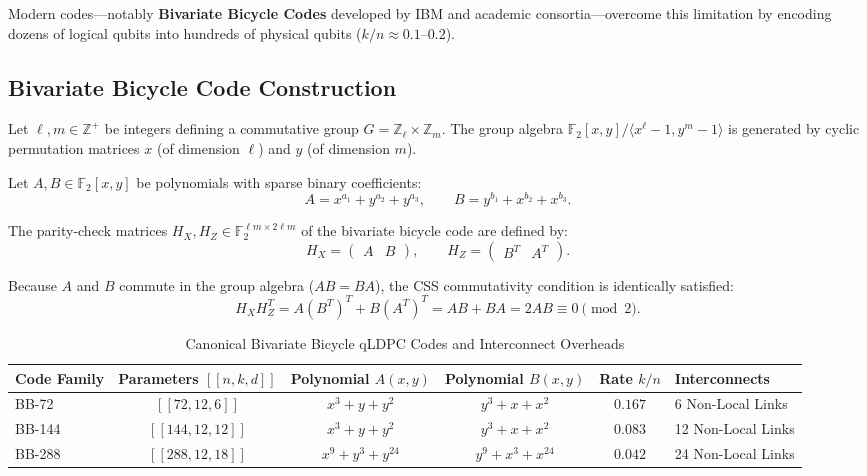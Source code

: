 Modern  codes---notably \textbf{Bivariate Bicycle Codes} developed by IBM and academic consortia---overcome this limitation by encoding dozens of logical qubits into hundreds of physical qubits ($k/n \approx 0.1\text{--}0.2$).

\subsection{Bivariate Bicycle Code Construction}
Let $\ell, m \in \mathbb{Z}^+$ be integers defining a commutative group $G = \mathbb{Z}_\ell \times \mathbb{Z}_m$. The group algebra $\mathbb{F}_2[x, y] / \langle x^\ell - 1, y^m - 1 \rangle$ is generated by cyclic permutation matrices $x$ (of dimension $\ell$) and $y$ (of dimension $m$).

Let $A, B \in \mathbb{F}_2[x, y]$ be polynomials with sparse binary coefficients:
\begin{equation}
    A = x^{a_1} + y^{a_2} + y^{a_3}, \qquad B = y^{b_1} + x^{b_2} + x^{b_3}.
\end{equation}

The parity-check matrices $H_X, H_Z \in \mathbb{F}_2^{\ell m \times 2\ell m}$ of the bivariate bicycle code are defined by:
\begin{equation}
    H_X = \begin{pmatrix} A & B \end{pmatrix}, \qquad H_Z = \begin{pmatrix} B^T & A^T \end{pmatrix}.
    \label{eq:bivariate_bicycle_hz_hx}
\end{equation}

Because $A$ and $B$ commute in the group algebra ($A B = B A$), the CSS commutativity condition is identically satisfied:
\begin{equation}
    H_X H_Z^T = A (B^T)^T + B (A^T)^T = A B + B A = 2 A B \equiv 0 \pmod 2.
\end{equation}

\begin{table}[htbp]
\centering
\small
\caption{Canonical Bivariate Bicycle qLDPC Codes and Interconnect Overheads}
\label{tab:bivariate_bicycle_specs}
\begin{tabularx}{\textwidth}{l c c c c X}
\toprule
\textbf{Code Family} & \textbf{Parameters $[[n, k, d]]$} & \textbf{Polynomial $A(x,y)$} & \textbf{Polynomial $B(x,y)$} & \textbf{Rate $k/n$} & \textbf{Interconnects} \\
\midrule
BB-72 & $[[72, 12, 6]]$ & $x^3 + y + y^2$ & $y^3 + x + x^2$ & $0.167$ & 6 Non-Local Links \\
BB-144 & $[[144, 12, 12]]$ & $x^3 + y + y^2$ & $y^3 + x + x^2$ & $0.083$ & 12 Non-Local Links \\
BB-288 & $[[288, 12, 18]]$ & $x^9 + y^3 + y^{24}$ & $y^9 + x^3 + x^{24}$ & $0.042$ & 24 Non-Local Links \\
\bottomrule
\end{tabularx}
\end{table}

